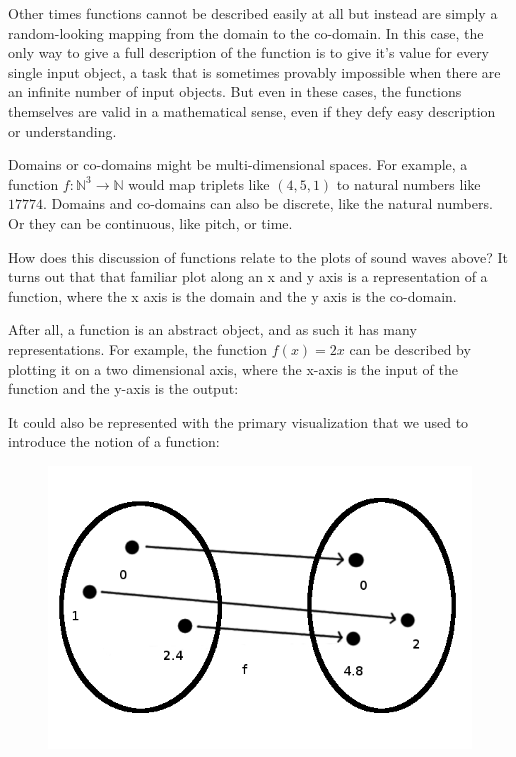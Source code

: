 \documentclass[UTF8]{book}
\begin{document}
\begin{CJK}{UTF8}{gbsn}
Other times functions cannot be described easily at all but instead are simply a random-looking mapping from the domain to the co-domain. In this case, the only way to give a full description of the function is to give it's value for every single input object, a task that is sometimes provably impossible when there are an infinite number of input objects. But even in these cases, the functions themselves are valid in a mathematical sense, even if they defy easy description or understanding.

Domains or co-domains might be multi-dimensional spaces. For example, a function $f: \mathbb{N}^{3} \rightarrow \mathbb{N}$ would map triplets like $(4,5,1)$ to natural numbers like $17774$. Domains and co-domains can also be discrete, like the natural numbers. Or they can be continuous, like pitch, or time.

How does this discussion of functions relate to the plots of sound waves above? It turns out that that familiar plot along an x and y axis is a representation of a function, where the x axis is the domain and the y axis is the co-domain.

After all, a function is an abstract object, and as such it has many representations. For example, the function $f(x)=2x$ can be described by plotting it on a two dimensional axis, where the x-axis is the input of the function and the y-axis is the output:


It could also be represented with the primary visualization that we used to introduce the notion of a function:

\begin{figure}[H]
\centering
\includegraphics[width=0.8\linewidth]{function_2x}
\end{figure}


\end{CJK}
\end{document}
